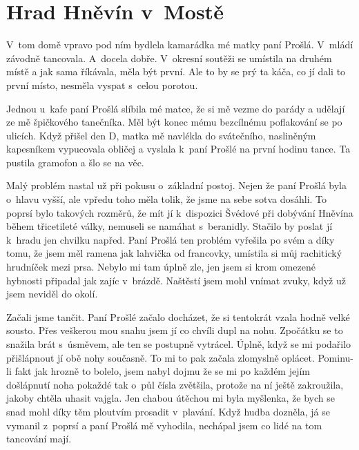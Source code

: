 
\chapter{Hrad Hněvín v~Mostě}

V~tom domě vpravo pod ním bydlela kamarádka mé matky paní Prošlá. V~mládí
závodně tancovala. A~docela dobře. V~okresní soutěži se umístila na druhém
místě a jak sama říkávala, měla být první. Ale to by se prý ta káča, co jí dali
to první místo, nesměla vyspat s~celou porotou.

Jednou u~kafe paní Prošlá slíbila mé matce, že si mě vezme do parády a udělají
ze mě špičkového tanečníka. Měl být konec mému bezcílnému poflakování se po
ulicích. Když přišel den D, matka mě navlékla do svátečního, nasliněným
kapesníkem vypucovala obličej a vyslala k~paní Prošlé na první hodinu tance. Ta
pustila gramofon a šlo se na věc.

Malý problém nastal už při pokusu o~základní postoj. Nejen že paní Prošlá byla
o~hlavu vyšší, ale vpředu toho měla tolik, že jsme na sebe sotva dosáhli. To
poprsí bylo takových rozměrů, že mít jí k~dispozici Švédové při dobývání
Hněvína během třicetileté války, nemuseli se namáhat s~beranidly. Stačilo by
poslat jí k~hradu jen chvilku napřed. Paní Prošlá ten problém vyřešila po svém
a díky tomu, že jsem měl ramena jak lahvička od francovky, umístila si můj
rachitický hrudníček mezi prsa. Nebylo mi tam úplně zle, jen jsem si krom
omezené hybnosti připadal jak zajíc v~brázdě. Naštěstí jsem mohl vnímat zvuky,
když už jsem neviděl do okolí.

Začali jsme tančit. Paní Prošlé začalo docházet, že si tentokrát vzala hodně
velké sousto. Přes veškerou mou snahu jsem jí co chvíli dupl na nohu. Zpočátku
se to snažila brát s~úsměvem, ale ten se postupně vytrácel. Úplně, když se mi
podařilo přišlápnout jí obě nohy současně. To mi to pak začala zlomyslně
oplácet. Pominu-li fakt jak hrozně to bolelo, jsem nabyl dojmu že se mi po
každém jejím došlápnutí noha pokaždé tak o~půl čísla zvětšila, protože na ní
ještě zakroužila, jakoby chtěla uhasit vajgla. Jen chabou útěchou mi byla
myšlenka, že bych se snad mohl díky těm ploutvím prosadit v~plavání. Když hudba
dozněla, já se vymanil z~poprsí a paní Prošlá mě vyhodila, nechápal jsem co
lidé na tom tancování mají.

